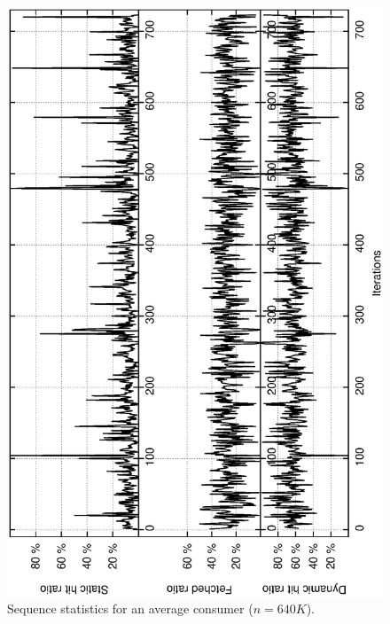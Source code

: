 \documentclass[10pt,journal,letterpaper,compsoc]{IEEEtran}
\begin{document}
\begin{figure}[thb]
\centerline{
						\includegraphics[angle=-90, scale=0.36]{fetch.eps}
            }
\caption{
Sequence statistics for an average consumer ($n=640K$).
}

\label{figConsumerFetch}
\end{figure}
\end{document}
